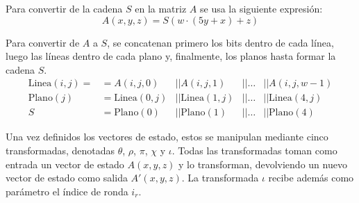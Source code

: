 Para convertir de la cadena \(S\) en la matriz \(A\) se usa la siguiente expresión:
\begin{equation}
	A(x,y,z)=S(w\cdot(5y+x)+z)
\end{equation}

Para convertir de \(A\) a \(S\), se concatenan primero los bits dentro de cada línea, luego las líneas dentro de cada plano y, finalmente, los planos hasta formar la cadena \(S\). 
\begin{equation}
	\begin{array}{lllll}
		\text{Linea}(i,j)=&=A(i,j,0)&||A(i,j,1)&|| \hdots &|| A(i,j,w-1)\\
		\text{Plano}(j)&=\text{Linea}(0,j)&||\text{Linea}(1,j)&|| \hdots &||   \text{Linea}(4,j)\\
		S&=\text{Plano}(0)&||\text{Plano}(1)&||\hdots&|| \text{Plano}(4)
	\end{array}
\end{equation}

Una vez definidos los vectores de estado, estos se manipulan mediante cinco transformadas, denotadas \(\theta\), \(\rho\), \(\pi\), \(\chi\) y \(\iota\). Todas las transformadas toman como entrada un vector de estado \(A(x,y,z)\) y lo transforman, devolviendo un nuevo vector de estado como salida \(A'(x,y,z)\). La transformada $\iota$ recibe además como parámetro el índice de ronda \(i_r\).

